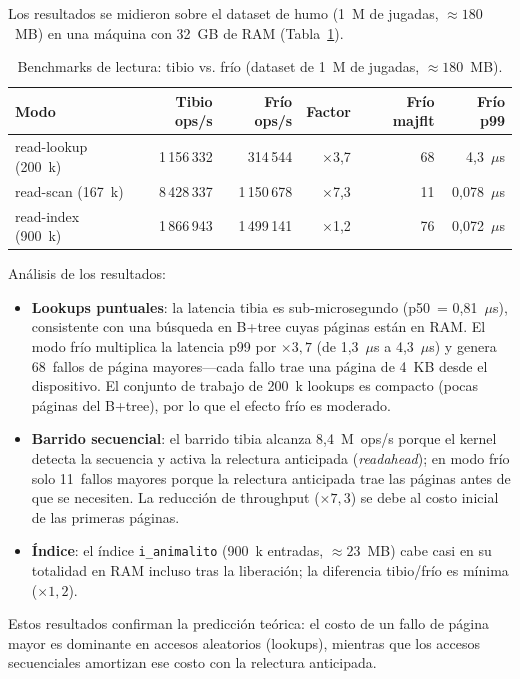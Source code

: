 \documentclass[12pt, letterpaper]{article}
\begin{document}
Los resultados se midieron sobre el dataset de humo (1~M de jugadas,
$\approx 180$~MB) en una máquina con 32~GB de RAM (Tabla~\ref{tab:fase4}).

\begin{table}[H]
\centering
\caption{Benchmarks de lectura: tibio vs. frío (dataset de 1~M de jugadas, $\approx 180$~MB).}
\label{tab:fase4}
\begin{tabular}{@{}l r r r r r@{}}
\toprule
\textbf{Modo} & \textbf{Tibio ops/s} & \textbf{Frío ops/s} & \textbf{Factor} & \textbf{Frío majflt} & \textbf{Frío p99} \\
\midrule
read-lookup (200~k) & 1\,156\,332 & 314\,544 & $\times$3,7 & 68 & 4,3~$\mu$s \\
read-scan (167~k) & 8\,428\,337 & 1\,150\,678 & $\times$7,3 & 11 & 0,078~$\mu$s \\
read-index (900~k) & 1\,866\,943 & 1\,499\,141 & $\times$1,2 & 76 & 0,072~$\mu$s \\
\bottomrule
\end{tabular}
\end{table}

Análisis de los resultados:

\begin{itemize}
    \item \textbf{Lookups puntuales}: la latencia tibia es sub-microsegundo
    (p50~= 0,81~$\mu$s), consistente con una búsqueda en B+tree cuyas
    páginas están en RAM. El modo frío multiplica la latencia p99 por
    $\times 3{,}7$ (de 1,3~$\mu$s a 4,3~$\mu$s) y genera 68~fallos de
    página mayores---cada fallo trae una página de 4~KB desde el
    dispositivo. El conjunto de trabajo de 200~k lookups es compacto
    (pocas páginas del B+tree), por lo que el efecto frío es moderado.
    \item \textbf{Barrido secuencial}: el barrido tibia alcanza
    8,4~M~ops/s porque el kernel detecta la secuencia y activa la
    relectura anticipada (\emph{readahead}); en modo frío solo 11~fallos
    mayores porque la relectura anticipada trae las páginas antes de que
    se necesiten. La reducción de throughput ($\times 7{,}3$) se debe al
    costo inicial de las primeras páginas.
    \item \textbf{Índice}: el índice \texttt{i\_animalito} (900~k
    entradas, $\approx 23$~MB) cabe casi en su totalidad en RAM incluso
    tras la liberación; la diferencia tibio/frío es mínima ($\times 1{,}2$).
\end{itemize}

Estos resultados confirman la predicción teórica: el costo de un fallo de
página mayor es dominante en accesos aleatorios (lookups), mientras que los
accesos secuenciales amortizan ese costo con la relectura anticipada.
\end{document}
